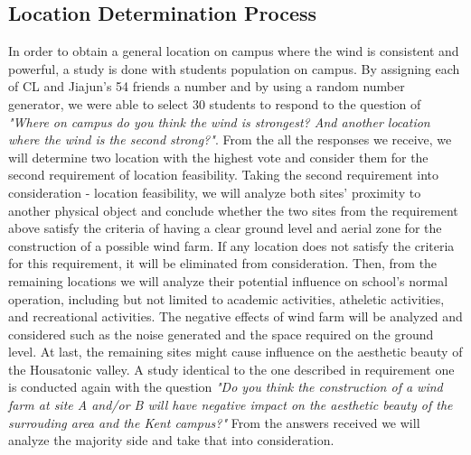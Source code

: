 \documentclass[review]{elsarticle}
\begin{document}
\subsection{Location Determination Process}
In order to obtain a general location on campus where the wind is consistent and powerful, a study is done with students population on campus. By assigning each of CL and 
Jiajun's 54 friends a number and by using a random number generator, we were able to select 30 students to respond to the question of 
\textit{"Where on campus do you think the wind is strongest? And another location where the wind is the second strong?"}. From the all the responses we receive, we will 
determine two location with the highest vote and consider them for the second requirement of location feasibility. Taking the second requirement into consideration - location feasibility, 
we will analyze both sites' proximity to another physical object and conclude whether the two 
 sites from the requirement above satisfy the criteria of having a clear ground level and aerial zone for the construction of a possible wind farm. If any location does 
 not satisfy the criteria for this requirement, it will be eliminated from consideration. Then, from the remaining locations we will analyze their potential influence 
 on school's normal operation, including but not limited to academic activities, atheletic activities, and recreational activities. The negative effects of wind farm will 
 be analyzed and considered such as the noise generated and the space required on the ground level. At last, the remaining sites might cause influence on the aesthetic beauty 
 of the Housatonic valley. A study identical to the one described in requirement one is conducted again with the question \textit{"Do you think the construction of a wind 
 farm at site A and/or B will have negative impact on the aesthetic beauty of the surrouding area and the Kent campus?"} From the answers received we will analyze the 
 majority side and take that into consideration. 
\end{document}
